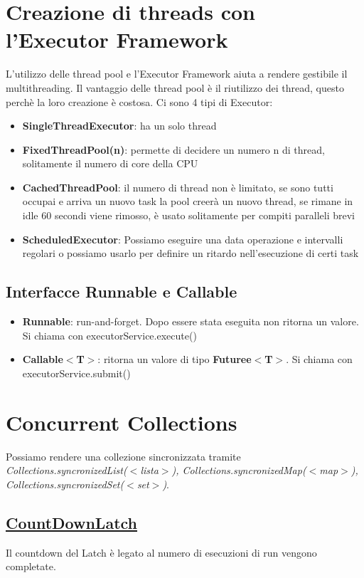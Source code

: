 \documentclass[11pt,a4paper]{book}
\begin{document}
\chapter{Creazione di threads con l'Executor Framework}
L'utilizzo delle thread pool e l'Executor Framework aiuta a rendere gestibile il multithreading. Il vantaggio delle thread pool è il riutilizzo dei thread, questo perchè la loro creazione è costosa.
Ci sono 4 tipi di Executor:
\begin{itemize}
	\item \textbf{SingleThreadExecutor}: ha un solo thread
	\item \textbf{FixedThreadPool(n)}: permette di decidere un numero n di thread, solitamente il numero di core della CPU
	\item \textbf{CachedThreadPool}: il numero di thread non è limitato, se sono tutti occupai e arriva un nuovo task la pool creerà un nuovo thread, se rimane in idle 60 secondi viene rimosso, è usato solitamente per compiti paralleli brevi
	\item \textbf{ScheduledExecutor}: Possiamo eseguire una data operazione e intervalli regolari o possiamo usarlo per definire un ritardo nell'esecuzione di certi task
\end{itemize}

\section{Interfacce Runnable e Callable}
\begin{itemize}
	\item \textbf{Runnable}: run-and-forget. Dopo essere stata eseguita non ritorna un valore. Si chiama con executorService.execute()
	\item \textbf{Callable$<$T$>$}: ritorna un valore di tipo \textbf{Futuree$<$T$>$}. Si chiama con executorService.submit()
\end{itemize}

\chapter{Concurrent Collections}
Possiamo rendere una collezione sincronizzata tramite \emph{Collections.syncronizedList($<$lista$>$), Collections.syncronizedMap($<$map$>$), Collections.syncronizedSet($<$set$>$)}.
\section{\href{https://docs.oracle.com/javase/7/docs/api/java/util/concurrent/CountDownLatch.html}{CountDownLatch}}
Il countdown del Latch è legato al numero di esecuzioni di run vengono completate.
\end{document}
